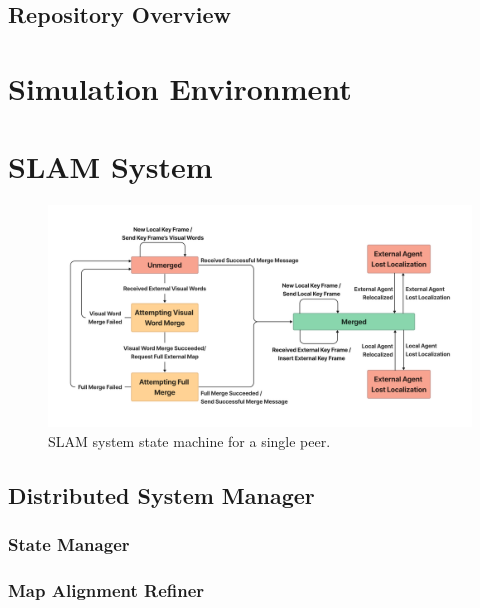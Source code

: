 \subsection{Repository Overview}
\label{sec:repository-overview}

\section{Simulation Environment}
\label{sec:simulation-environment}

\section{SLAM System}
\label{sec:slam-system}

\begin{figure}[h]
    \centering
    \includegraphics[trim=5cm 5cm 5cm 5cm, scale=0.2]{figures/slam_system_state_machine.pdf}
    \caption{SLAM system state machine for a single peer.}
    \label{fig:agent-diagram}
\end{figure}

\subsection{Distributed System Manager}
\label{sec:distributed-system-manager}

\subsubsection{State Manager}
\label{sec:state-manager}

\subsubsection{Map Alignment Refiner}
\label{sec:map-alignment-refiner}

